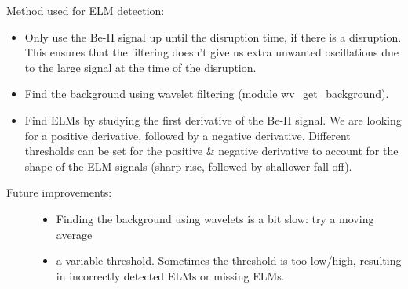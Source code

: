 \documentclass[letterpaper,10pt,english]{sphinxmanual}
\begin{document}
Method used for ELM detection:
\begin{itemize}
\item {} 
Only use the Be-II signal up until the disruption time, if there is a disruption.
This ensures that the filtering doesn't give us extra unwanted oscillations due
to the large signal at the time of the disruption.

\item {} 
Find the background using wavelet filtering (module wv\_get\_background).

\item {} 
Find ELMs by studying the first derivative of the Be-II signal. We are looking for a positive derivative, followed by a negative derivative. Different thresholds can be set for the positive \& negative derivative to account for the shape of the ELM signals (sharp rise, followed by shallower fall off).

\end{itemize}
\begin{description}
\item[{Future improvements:}] \leavevmode\begin{itemize}
\item {} 
Finding the background using wavelets is a bit slow: try a moving average

\item {} 
a variable threshold. Sometimes the threshold is too low/high, resulting in incorrectly detected ELMs or missing ELMs.

\end{itemize}

\end{description}
\end{document}
